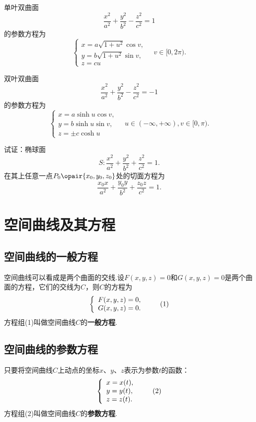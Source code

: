 \begin{example}
单叶双曲面\[
\frac{x^2}{a^2} + \frac{y^2}{b^2} - \frac{z^2}{c^2} = 1
\]的参数方程为\[
\left\{ \begin{array}{l}
x = a \sqrt{1+u^2} \cos v, \\
y = b \sqrt{1+u^2} \sin v, \\
z = c u
\end{array} \right.
\quad
v\in[0,2\pi).
\]

双叶双曲面\[
\frac{x^2}{a^2} + \frac{y^2}{b^2} - \frac{z^2}{c^2} = -1
\]的参数方程为\[
\left\{ \begin{array}{l}
x = a \sinh u \cos v, \\
y = b \sinh u \sin v, \\
z = \pm c \cosh u
\end{array} \right.
\quad
u\in(-\infty,+\infty),
v\in[0,\pi).
\]
\end{example}

\begin{example}
试证：椭球面\[
S: \frac{x^2}{a^2} + \frac{y^2}{b^2} + \frac{z^2}{c^2} = 1.
\]在其上任意一点\(P_0\opair{x_0,y_0,z_0}\)处的切面方程为
\begin{equation}\label{equation:解析几何.椭球面的切平面}
\frac{x_0 x}{a^2} + \frac{y_0 y}{b^2} + \frac{z_0 z}{c^2} = 1.
\end{equation}
\end{example}

\section{空间曲线及其方程}
\subsection{空间曲线的一般方程}
空间曲线可以看成是两个曲面的交线.设\(F(x,y,z)=0\)和\(G(x,y,z)=0\)是两个曲面的方程，它们的交线为\(C\)，则\(C\)的方程为\begin{gather}
\left\{ \begin{array}{l}
F(x,y,z)=0, \\
G(x,y,z)=0.
\end{array} \right. \tag1
\end{gather}
方程组(1)叫做空间曲线\(C\)的\textbf{一般方程}.

\subsection{空间曲线的参数方程}
只要将空间曲线\(C\)上动点的坐标\(x\)、\(y\)、\(z\)表示为参数\(t\)的函数：\begin{gather}
\left\{ \begin{array}{l}
x=x(t), \\
y=y(t), \\
z=z(t).
\end{array} \right. \tag2
\end{gather}
方程组(2)叫做空间曲线\(C\)的\textbf{参数方程}.

